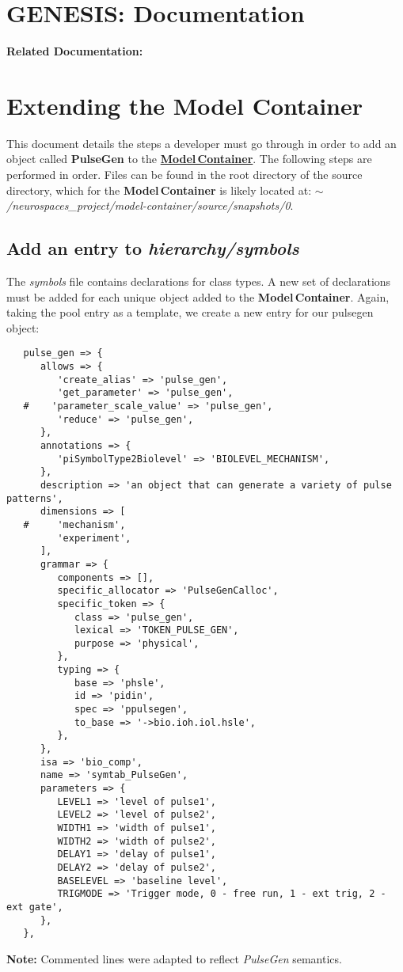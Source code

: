 \documentclass[12pt]{article}
\begin{document}
\section*{GENESIS: Documentation}

{\bf Related Documentation:}

\section*{Extending the Model Container}

This document details the steps a developer must go through in order to add an object called {\bf PulseGen} to the \href{../model-container/model-container.tex}{\bf Model\,Container}. The following steps are performed in order. Files can be found in the root directory of the source directory, which for the {\bf Model\,Container} is likely located at: {\it $\sim$/neurospaces\_project/model-container/source/snapshots/0}.

\subsection*{Add an entry to {\it hierarchy/symbols}}

The {\it symbols} file contains declarations for class types. A new set of declarations must be added for each unique object added to the {\bf Model\,Container}. Again, taking the pool entry as a template, we create a new entry for our pulsegen object:
\begin{verbatim}
   pulse_gen => {
      allows => {
         'create_alias' => 'pulse_gen',
         'get_parameter' => 'pulse_gen',
   #    'parameter_scale_value' => 'pulse_gen',
         'reduce' => 'pulse_gen',
      },
      annotations => {
         'piSymbolType2Biolevel' => 'BIOLEVEL_MECHANISM',
      },
      description => 'an object that can generate a variety of pulse patterns',
      dimensions => [
   #     'mechanism',
         'experiment',
      ],
      grammar => {
         components => [],
         specific_allocator => 'PulseGenCalloc',
         specific_token => {
            class => 'pulse_gen',
            lexical => 'TOKEN_PULSE_GEN',
            purpose => 'physical',
         },
         typing => {
            base => 'phsle',
            id => 'pidin',
            spec => 'ppulsegen',
            to_base => '->bio.ioh.iol.hsle',
         },
      },
      isa => 'bio_comp',
      name => 'symtab_PulseGen',
      parameters => {
         LEVEL1 => 'level of pulse1',
         LEVEL2 => 'level of pulse2',
         WIDTH1 => 'width of pulse1',
         WIDTH2 => 'width of pulse2',
         DELAY1 => 'delay of pulse1',
         DELAY2 => 'delay of pulse2',
         BASELEVEL => 'baseline level',
         TRIGMODE => 'Trigger mode, 0 - free run, 1 - ext trig, 2 - ext gate',
      },
   },
\end{verbatim}        
{\bf Note:} Commented lines were adapted to reflect {\it PulseGen} semantics.
\end{document}
